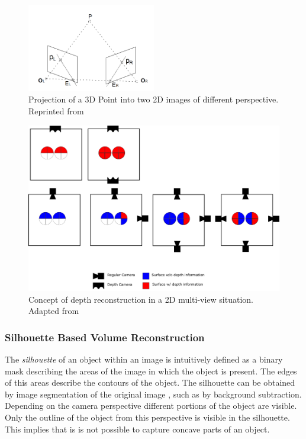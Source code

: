 \begin{figure}[hbt]
	\centering
	\includegraphics[width=0.5\textwidth, keepaspectratio]{resources/Epipolar_Geometry}
	\caption[Projection of a 3D Point into two 2D images of different perspective]{\label{fig:sota:epipolar} Projection of a 3D Point into two 2D images of different perspective. Reprinted from \textcite{wiki2009epipolar}}
\end{figure}

\begin{figure}[hbt]
	\centering
	\includegraphics[width=1.0\textwidth, keepaspectratio]{resources/multiview}
	\caption[Concept of depth reconstruction in a 2D multi-view situation]{\label{fig:sota:mulitviewtop}Concept of depth reconstruction in a 2D multi-view situation.
	Adapted from \textcite[][]{sonaten2011volume}}
\end{figure}



\subsubsection{Silhouette Based Volume Reconstruction}

The \emph{silhouette} of an object within an image is intuitively defined 
as a binary mask describing the areas of the image in which the object is present. 
The edges of this areas describe the contours of the object.
The silhouette can be obtained by image segmentation of the original image \autocite[][Chap.~2]{zhang2017imageanalysis}, such as by background subtraction.
Depending on the camera perspective different portions of the object are visible.
Only the outline of the object from this perspective is visible in the silhouette.
This implies that is is not possible to capture concave parts of an object.

